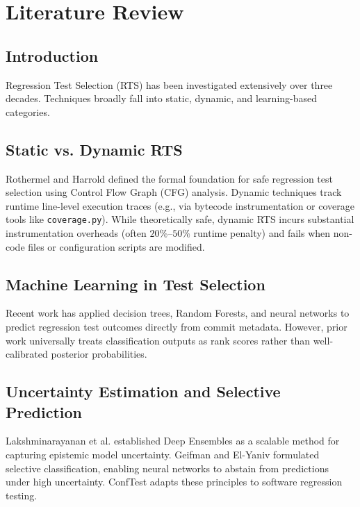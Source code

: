 \chapter{Literature Review}

\section{Introduction}
Regression Test Selection (RTS) has been investigated extensively over three decades. Techniques broadly fall into static, dynamic, and learning-based categories.

\section{Static vs. Dynamic RTS}
Rothermel and Harrold defined the formal foundation for safe regression test selection using Control Flow Graph (CFG) analysis. Dynamic techniques track runtime line-level execution traces (e.g., via bytecode instrumentation or coverage tools like \texttt{coverage.py}). While theoretically safe, dynamic RTS incurs substantial instrumentation overheads (often $20\%\text{--}50\%$ runtime penalty) and fails when non-code files or configuration scripts are modified.

\section{Machine Learning in Test Selection}
Recent work has applied decision trees, Random Forests, and neural networks to predict regression test outcomes directly from commit metadata. However, prior work universally treats classification outputs as rank scores rather than well-calibrated posterior probabilities.

\section{Uncertainty Estimation and Selective Prediction}
Lakshminarayanan et al. established Deep Ensembles as a scalable method for capturing epistemic model uncertainty. Geifman and El-Yaniv formulated selective classification, enabling neural networks to abstain from predictions under high uncertainty. ConfTest adapts these principles to software regression testing.
